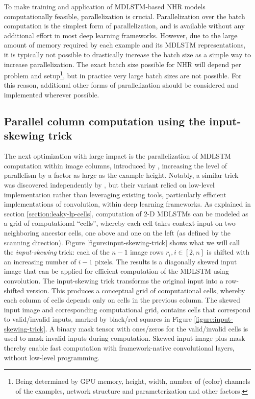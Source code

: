 \documentclass[conference]{IEEEtran}
\renewcommand{\ac}[1]{\gls{#1}}
\renewcommand{\acp}[1]{\glspl{#1}}
\begin{document}
To make  training and application of \ac{MDLSTM}-based \ac{NHR} models computationally feasible, 
parallelization is crucial. 
 Parallelization over the batch computation is the simplest form of parallelization, and is 
available without any additional effort in most deep learning frameworks. 
However, due to the large amount of memory required by each example and its \ac{MDLSTM} representations, 
it is typically not possible to drastically increase the batch size as a simple way to increase parallelization.
The exact batch size possible for \ac{NHR} will depend per problem and setup\footnote{Being determined by GPU memory, height, width, number of (color) channels of the examples, network structure and parameterization and other factors.},
but in practice very large batch sizes are not possible. 
For this reason, additional other forms of parallelization should be considered and implemented wherever possible. 


\subsection{Parallel column computation using the input-skewing trick}
The next optimization with large impact is the parallelization of \ac{MDLSTM} computation within image columns, introduced by \cite{VanDenOord:2016:PixelRecurrentNeuralNetworks},
increasing the level of parallelism by a factor as large as the example height. Notably, a similar trick was discovered
independently by \cite{Voigtlaender2016}, but their variant relied on low-level implementation rather than leveraging existing tools, particularly efficient implementations of convolution, within deep learning frameworks.
As explained in section \ref{section:leaky-lp-cells}, computation of 2-D \acp{MDLSTM} can be modeled as a grid of computational ``cells'', 
whereby each cell takes context input on two neighboring ancestor cells, one above and one on the left (as defined by the scanning direction). 
Figure \ref{figure:input-skewing-trick} shows what we will call the \emph{input-skewing} trick: 
each of the $n-1$ image rows $r_i, i \in [2,n]$ is shifted  
with an increasing number of $i-1$ pixels. The results is a diagonally skewed input image that can be  
applied for efficient computation of the \ac{MDLSTM} using convolution. 
The input-skewing trick transforms the original input into a row-shifted version. This produces a conceptual grid of computational cells,
whereby each column of cells depends only on cells in the previous column. 
The skewed input image and corresponding computational grid, contains cells that correspond to valid/invalid inputs, 
marked by black/red squares in Figure \ref{figure:input-skewing-trick}. 
A binary mask tensor with ones/zeros for the valid/invalid cells is used to mask invalid inputs during computation.
Skewed input image plus mask thereby enable fast computation with framework-native convolutional layers, 
without low-level programming.
\end{document}
